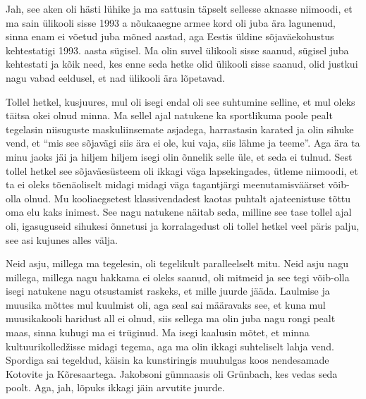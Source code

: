 
Jah, see aken oli hästi lühike ja ma sattusin täpselt sellesse aknasse niimoodi, et ma sain ülikooli sisse 1993 a nõukaaegne armee kord oli juba ära lagunenud, sinna enam ei võetud juba mõned aastad, aga Eestis üldine sõjaväekohustus kehtestatigi  1993. aasta sügisel. Ma olin suvel ülikooli sisse saanud, sügisel juba kehtestati ja kõik need, kes enne seda hetke olid ülikooli sisse saanud, olid justkui nagu vabad eeldusel, et nad ülikooli ära lõpetavad. 


Tollel hetkel, kusjuures, mul oli isegi endal oli see suhtumine selline, et mul oleks täitsa okei olnud minna. Ma sellel ajal natukene ka sportlikuma poole pealt tegelasin niisuguste maskuliinsemate asjadega, harrastasin karated ja olin sihuke  vend, et \enquote{mis see sõjavägi siis ära ei ole, kui vaja, siis lähme ja teeme}. Aga ära ta minu jaoks jäi ja hiljem hiljem isegi olin õnnelik  selle üle, et seda ei tulnud. Sest tollel  hetkel see sõjaväesüsteem oli ikkagi väga lapsekingades, ütleme niimoodi, et ta ei oleks tõenäoliselt midagi midagi väga tagantjärgi meenutamisväärset võib-olla olnud. Mu kooliaegsetest klassivendadest kaotas puhtalt  ajateenistuse tõttu oma elu kaks inimest. See nagu natukene näitab seda,  milline see tase tollel ajal oli, igasuguseid sihukesi õnnetusi ja  korralagedust oli tollel hetkel veel päris palju, see asi kujunes alles välja. 


Neid asju, millega ma tegelesin, oli tegelikult paralleelselt mitu. Neid asju nagu millega, millega nagu hakkama ei oleks saanud, oli mitmeid ja see tegi võib-olla isegi natukene nagu otsustamist raskeks, et mille juurde jääda. Laulmise ja muusika mõttes mul kuulmist oli, aga seal sai määravaks see, et kuna mul muusikakooli haridust all ei olnud, siis  sellega ma olin juba nagu rongi pealt maas, sinna kuhugi ma ei  trüginud. Ma isegi kaalusin mõtet, et minna kultuurikolledžisse midagi tegema, aga ma olin ikkagi suhteliselt lahja vend. Spordiga sai tegeldud, käisin ka kunstiringis muuhulgas koos  nendesamade Kotovite ja Kõresaartega.  Jakobsoni gümnaasis oli Grünbach, kes vedas seda poolt. Aga, jah, lõpuks ikkagi jäin arvutite juurde. 

